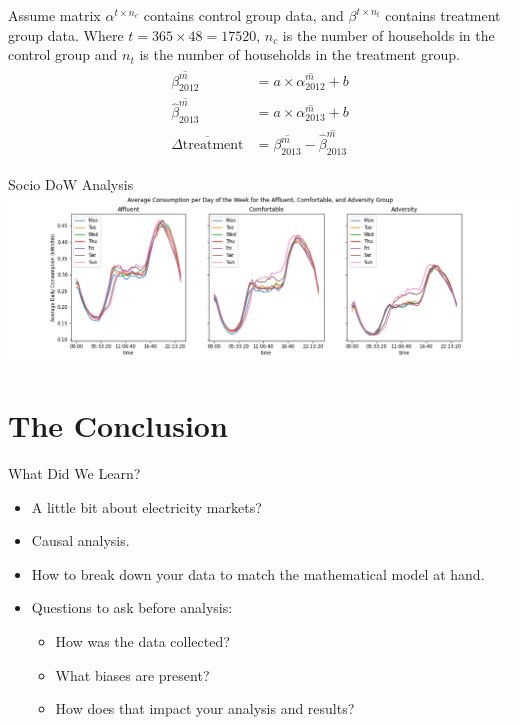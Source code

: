 \documentclass{beamer}
\begin{document}
\begin{frame}
  Assume matrix $\alpha^{t \times n_c}$ contains control group data, and $\beta^{t \times n_t}$ contains treatment group data. Where $t = 365 \times 48 = 17520$, $n_c$ is the number of households in the control group and $n_t$ is the number of households in the treatment group.
  \begin{align}
    \begin{split}
      \overline{\beta^m_{2012}} &= a \times \overline{\alpha^m_{2012}} + b \\
      \overline{\hat{\beta}^m_{2013}} &= a \times \overline{\alpha^m_{2013}} + b \\
      \overline{\Delta\mbox{treatment}} &= \overline{\beta^m_{2013}} - \overline{\hat{\beta}^m_{2013}}
    \end{split}
  \end{align}
\end{frame}

\begin{frame}{Socio DoW Analysis}
  \centering
  \includegraphics[width=1.1\textwidth]{images/dow-socio.png}
\end{frame}

\section{The Conclusion}

\begin{frame}{What Did We Learn?}
  \begin{itemize}
    \item<+-> A little bit about electricity markets?
    \item<+-> Causal analysis.
    \item<+-> How to break down your data to match the mathematical model at hand.
    \item<+-> Questions to ask before analysis:
    \begin{itemize}
      \item<+-> How was the data collected? 
      \item<+-> What biases are present?
      \item<+-> How does that impact your analysis and results?
    \end{itemize}
  \end{itemize}
\end{frame}
\end{document}
